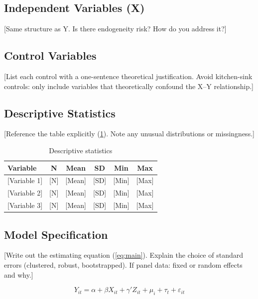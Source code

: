 \documentclass[12pt,a4paper]{article}
\begin{document}
\subsection{Independent Variables (X)} %
[Same structure as Y. Is there endogeneity risk? How do you address it?]

\subsection{Control Variables} %
[List each control with a one-sentence theoretical justification. Avoid kitchen-sink controls: only include variables that theoretically confound the X--Y relationship.]

\subsection{Descriptive Statistics} %
[Reference the table explicitly (\cref{tab:descr}). Note any unusual distributions or missingness.]

% 
\begin{table}[htbp]
    \centering
    \footnotesize
    \caption{Descriptive statistics}
    \label{tab:descr}
    \begin{tabular}{l*{5}{c}}
        \toprule
        Variable & N & Mean & SD & Min & Max \\
        \midrule
        {[Variable 1]} & [N] & [Mean] & [SD] & [Min] & [Max] \\
        {[Variable 2]} & [N] & [Mean] & [SD] & [Min] & [Max] \\
        {[Variable 3]} & [N] & [Mean] & [SD] & [Min] & [Max] \\
        \bottomrule
    \end{tabular}
\end{table}

\subsection{Model Specification} %
[Write out the estimating equation (\cref{eq:main}). Explain the choice of standard errors (clustered, robust, bootstrapped). If panel data: fixed or random effects and why.]

\begin{equation}
    Y_{it} = \alpha + \beta X_{it} + \gamma' Z_{it} + \mu_i + \tau_t + \varepsilon_{it}
    \label{eq:main}
\end{equation}
\end{document}
